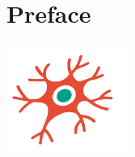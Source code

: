 \vspace*{1in}


\section*{Preface}
\lipsum[1-2]

\vfill

\begin{center}
    \includegraphics[width=0.3\textwidth]{src/assets/images/neuron-illustrations/neuron-illustration1.pdf}
\end{center}

\vfill
